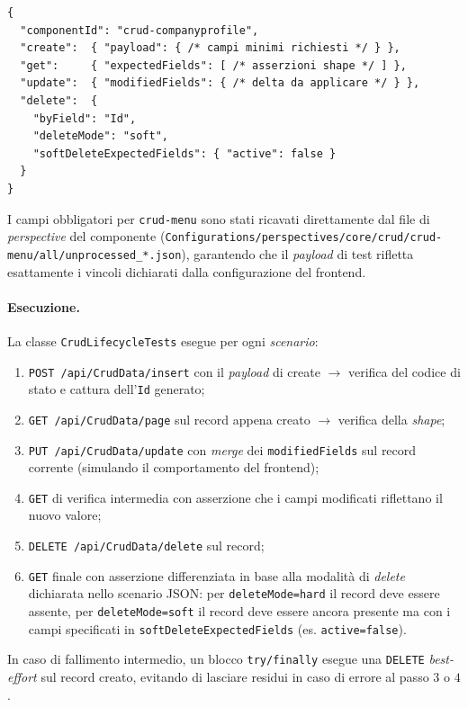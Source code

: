 \begin{verbatim}
{
  "componentId": "crud-companyprofile",
  "create":  { "payload": { /* campi minimi richiesti */ } },
  "get":     { "expectedFields": [ /* asserzioni shape */ ] },
  "update":  { "modifiedFields": { /* delta da applicare */ } },
  "delete":  {
    "byField": "Id",
    "deleteMode": "soft",
    "softDeleteExpectedFields": { "active": false }
  }
}
\end{verbatim}

I campi obbligatori per \texttt{crud-menu} sono stati ricavati direttamente dal file di \emph{perspective} del componente (\texttt{Configurations/perspectives/core/crud/crud-menu/all/unprocessed\_*.json}), garantendo che il \emph{payload} di test rifletta esattamente i vincoli dichiarati dalla configurazione del frontend.

\paragraph{Esecuzione.} La classe \texttt{CrudLifecycleTests} esegue per ogni \emph{scenario}:
\begin{enumerate}
    \item \texttt{POST /api/CrudData/insert} con il \emph{payload} di create $\rightarrow$ verifica del codice di stato e cattura dell'\texttt{Id} generato;
    \item \texttt{GET /api/CrudData/page} sul record appena creato $\rightarrow$ verifica della \emph{shape};
    \item \texttt{PUT /api/CrudData/update} con \emph{merge} dei \texttt{modifiedFields} sul record corrente (simulando il comportamento del frontend);
    \item \texttt{GET} di verifica intermedia con asserzione che i campi modificati riflettano il nuovo valore;
    \item \texttt{DELETE /api/CrudData/delete} sul record;
    \item \texttt{GET} finale con asserzione differenziata in base alla modalità di \emph{delete} dichiarata nello scenario JSON: per \texttt{deleteMode=hard} il record deve essere assente, per \texttt{deleteMode=soft} il record deve essere ancora presente ma con i campi specificati in \texttt{softDeleteExpectedFields} (es. \texttt{active=false}).
\end{enumerate}

In caso di fallimento intermedio, un blocco \texttt{try/finally} esegue una \texttt{DELETE} \emph{best-effort} sul record creato, evitando di lasciare residui in caso di errore al passo $3$ o $4$.

